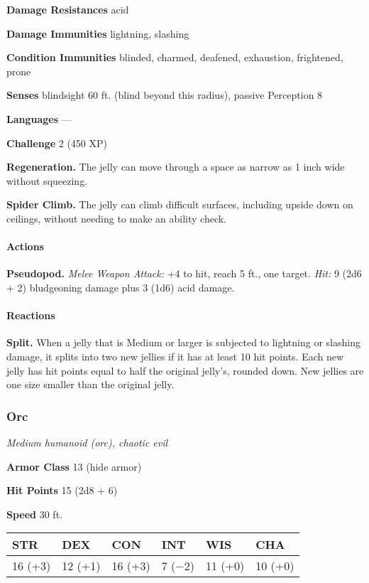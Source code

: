 \documentclass[
]{article}
\begin{document}
\textbf{Damage Resistances} acid

\textbf{Damage Immunities} lightning, slashing

\textbf{Condition Immunities} blinded, charmed, deafened, exhaustion,
frightened, prone

\textbf{Senses} blindsight 60 ft. (blind beyond this radius), passive
Perception 8

\textbf{Languages} ---

\textbf{Challenge} 2 (450 XP)

\textbf{Regeneration.} The jelly can move through a space as narrow as 1
inch wide without squeezing.

\textbf{Spider Climb.} The jelly can climb difficult surfaces, including
upside down on ceilings, without needing to make an ability check.

\hypertarget{actions-5}{%
\paragraph{Actions}\label{actions-5}}

\textbf{Pseudopod.} \emph{Melee Weapon Attack:} +4 to hit, reach 5 ft.,
one target. \emph{Hit:} 9 (2d6 + 2) bludgeoning damage plus 3 (1d6) acid
damage.

\hypertarget{reactions-1}{%
\paragraph{Reactions}\label{reactions-1}}

\textbf{Split.} When a jelly that is Medium or larger is subjected to
lightning or slashing damage, it splits into two new jellies if it has
at least 10 hit points. Each new jelly has hit points equal to half the
original jelly's, rounded down. New jellies are one size smaller than
the original jelly.

\hypertarget{orc}{%
\subsubsection{Orc}\label{orc}}

\emph{Medium humanoid (orc), chaotic evil}

\textbf{Armor Class} 13 (hide armor)

\textbf{Hit Points} 15 (2d8 + 6)

\textbf{Speed} 30 ft.

\begin{longtable}[]{@{}llllll@{}}
\toprule
STR & DEX & CON & INT & WIS & CHA\tabularnewline
\midrule
\endhead
16 (+3) & 12 (+1) & 16 (+3) & 7 (−2) & 11 (+0) & 10 (+0)\tabularnewline
\bottomrule
\end{longtable}
\end{document}
